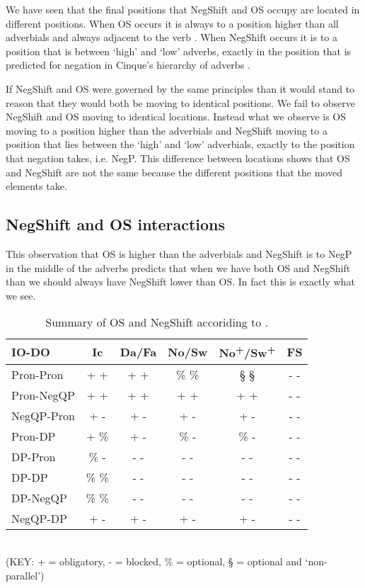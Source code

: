 \documentclass[12pt, letterpaper]{article}
\begin{document}
We have seen that the final positions that NegShift and OS occupy are located in different positions. When OS occurs it is always to a position higher than all adverbials and always adjacent to the verb \citep{holmbergWordOrderSyntactic1986,holmbergRemarksHolmbergGeneralization1999,erteschik-shirSoundPatternsSyntax2005}. When NegShift occurs it is to a position that is between `high' and `low' adverbs, exactly in the position that is predicted for negation in Cinque's hierarchy of adverbs \citep{nilsenAdverbsAshift1997,svenoniusStrainsNegationNorwegian2002}. 

If NegShift and OS were governed by the same principles than it would stand to reason that they would both be moving to identical positions. We fail to observe NegShift and OS moving to identical locations. Instead what we observe is OS moving to a position higher than the adverbials and NegShift moving to a position that lies between the `high' and `low' adverbials, exactly to the position that negation takes, i.e. NegP. This difference between locations shows that OS and NegShift are not the same because the different positions that the moved elements take.

\subsection{NegShift and OS interactions} \label{sec:INTERACTION}

This observation that OS is higher than the adverbials and NegShift is to NegP in the middle of the adverbs predicts that when we have both OS and NegShift than we should always have NegShift lower than OS. In fact this is exactly what we see.
\begin{table}[!ht]
\centering
\caption{Summary of OS and NegShift accoriding to \citet{christensenInterfacesNegationSyntax2005}.}
\label{tab:OSNEGS}
\begin{tabular}{lccccc}
\hline
IO-DO & Ic & Da/Fa & No/Sw & No\textsuperscript{+}/Sw\textsuperscript{+} & FS  \\
\hline 
Pron-Pron	&	+ +	&	+ +	&	\% \%	&	§ §	&	- -	\\
Pron-NegQP	&	+ +	&	+ +	&	+ +	&	+ +	&	- -	\\
NegQP-Pron	&	+ -	&	+ -	&	+ -	&	+ -	&	- -	\\
Pron-DP	&	+ \%	&	+ -	&	\% -	&	\% -	&	- -	\\
DP-Pron	&	\% -	&	- -	&	- -	&	- -	&	- -	\\
DP-DP	&	\% \%	&	- -	&	- -	&	- -	&	- -	\\
DP-NegQP	&	\% \%	&	- -	&	- -	&	- -	&	- -	\\
NegQP-DP	&	+ -	&	+ -	&	+ -	&	+ -	&	- -	\\
\hline 
\end{tabular}\\
(KEY: + = obligatory, - = blocked, \% = optional, § = optional and `non-parallel’)
\end{table}
\end{document}
